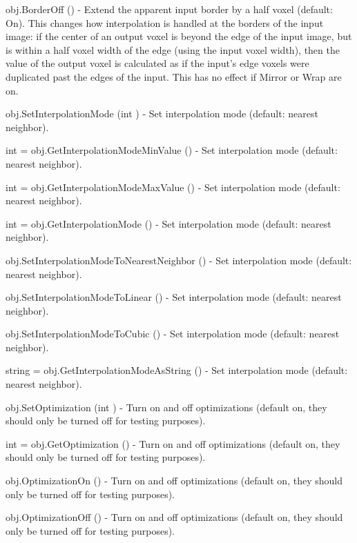 \begin{DoxyItemize}
\item {\ttfamily obj.\-Border\-Off ()} -\/ Extend the apparent input border by a half voxel (default\-: On). This changes how interpolation is handled at the borders of the input image\-: if the center of an output voxel is beyond the edge of the input image, but is within a half voxel width of the edge (using the input voxel width), then the value of the output voxel is calculated as if the input's edge voxels were duplicated past the edges of the input. This has no effect if Mirror or Wrap are on.  
\item {\ttfamily obj.\-Set\-Interpolation\-Mode (int )} -\/ Set interpolation mode (default\-: nearest neighbor).  
\item {\ttfamily int = obj.\-Get\-Interpolation\-Mode\-Min\-Value ()} -\/ Set interpolation mode (default\-: nearest neighbor).  
\item {\ttfamily int = obj.\-Get\-Interpolation\-Mode\-Max\-Value ()} -\/ Set interpolation mode (default\-: nearest neighbor).  
\item {\ttfamily int = obj.\-Get\-Interpolation\-Mode ()} -\/ Set interpolation mode (default\-: nearest neighbor).  
\item {\ttfamily obj.\-Set\-Interpolation\-Mode\-To\-Nearest\-Neighbor ()} -\/ Set interpolation mode (default\-: nearest neighbor).  
\item {\ttfamily obj.\-Set\-Interpolation\-Mode\-To\-Linear ()} -\/ Set interpolation mode (default\-: nearest neighbor).  
\item {\ttfamily obj.\-Set\-Interpolation\-Mode\-To\-Cubic ()} -\/ Set interpolation mode (default\-: nearest neighbor).  
\item {\ttfamily string = obj.\-Get\-Interpolation\-Mode\-As\-String ()} -\/ Set interpolation mode (default\-: nearest neighbor).  
\item {\ttfamily obj.\-Set\-Optimization (int )} -\/ Turn on and off optimizations (default on, they should only be turned off for testing purposes).  
\item {\ttfamily int = obj.\-Get\-Optimization ()} -\/ Turn on and off optimizations (default on, they should only be turned off for testing purposes).  
\item {\ttfamily obj.\-Optimization\-On ()} -\/ Turn on and off optimizations (default on, they should only be turned off for testing purposes).  
\item {\ttfamily obj.\-Optimization\-Off ()} -\/ Turn on and off optimizations (default on, they should only be turned off for testing purposes).  

\end{DoxyItemize}
